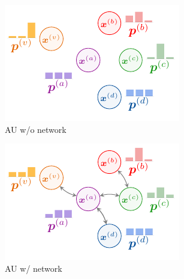 \begin{figure}
\centering
	\begin{subfigure}[t]{0.24\textwidth}
	    \centering
		\includegraphics[width=\textwidth]{sections/009_neurips2021/resources/no-network-aleatoric.pdf}
		\caption{AU w/o network}
		\label{subfig:au_without_network}
	\end{subfigure}
	\begin{subfigure}[t]{0.24\textwidth}
	    \centering
		\includegraphics[width=\textwidth]{sections/009_neurips2021/resources/network-aleatoric.pdf}
		\caption{AU w/ network}
		\label{subfig:au_with_network}
	\end{subfigure}
	\begin{subfigure}[t]{0.24\textwidth}
	    \centering

\end{subfigure}
\end{figure}
